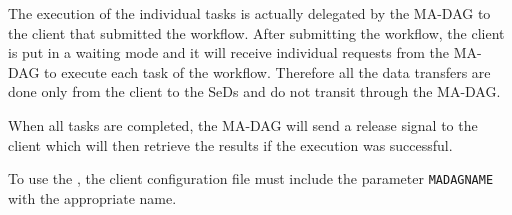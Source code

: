 The execution of the individual tasks is actually delegated by the
MA-DAG to the client that submitted the workflow. After submitting
the workflow, the client is put in a waiting mode and it will
receive individual requests from the MA-DAG to execute each task
of the workflow. Therefore all the data transfers are done only
from the client to the SeDs and do not transit through the MA-DAG.

When all tasks are completed, the MA-DAG will send a release signal
to the client which will then retrieve the results if the execution
was successful.

To use the \madag, the client configuration file must include
the parameter \texttt{MADAGNAME} with the appropriate name.

%
%
%
%
%
